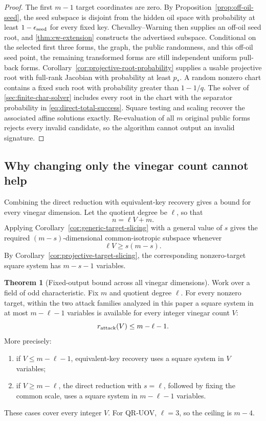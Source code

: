 \documentclass[11pt,a4paper]{article}
\theoremstyle{definition}
\newtheorem{theorem}{Theorem}[section]
\theoremstyle{remark}
\begin{document}
\begin{proof}
The first $m-1$ target coordinates are zero.  By
Proposition~\ref{prop:off-oil-seed}, the seed subspace is disjoint from the hidden oil
space with probability at least $1-\epsilon_{\rm seed}$ for every fixed key.
Chevalley--Warning then supplies an off-oil seed root, and
\cref{thm:cw-extension} constructs the advertised subspace.  Conditional on
the selected first three forms, the graph, the public randomness, and this off-oil
seed point, the remaining transformed forms are still independent uniform
pull-back forms.  Corollary~\ref{cor:projective-root-probability} supplies a
usable projective root with full-rank Jacobian with probability at least
$p_*$.  A random nonzero chart contains a fixed such root with probability
greater than $1-1/q$.  The solver of \cref{sec:finite-char-solver} includes
every root in the chart with the separator probability in
\eqref{eq:direct-total-success}.  Square testing and
scaling recover the associated affine solutions exactly.  Re-evaluation of
all $m$ original public forms rejects every invalid candidate,
so the algorithm cannot output an invalid signature.
\end{proof}

\subsection{Why changing only the vinegar count cannot help}

Combining the direct reduction with equivalent-key recovery gives
a bound for every vinegar dimension.  Let the quotient degree be $\ell$, so that
\[
 n=\ell V+m.
\]
Applying Corollary~\ref{cor:generic-target-slicing} with a general value of $s$ gives
the required $(m-s)$-dimensional common-isotropic subspace whenever
\begin{equation}\label{eq:scissors-feasibility}
 \ell V\ge s(m-s).
\end{equation}
By Corollary~\ref{cor:projective-target-slicing}, the corresponding nonzero-target
square system has $m-s-1$ variables.

\begin{theorem}[Fixed-output bound across all vinegar dimensions]\label{thm:security-scissors}
Work over a field of odd characteristic.  Fix $m$ and quotient degree $\ell$.  For every nonzero target, within the two
attack families analyzed in this paper a square system in at most
$m-\ell-1$ variables is available for every integer vinegar count $V$:
\begin{equation}\label{eq:scissors-bound}
 r_{\rm attack}(V)\le m-\ell-1.
\end{equation}
More precisely:
\begin{enumerate}
\item if $V\le m-\ell-1$, equivalent-key recovery uses a square
system in $V$ variables;
\item if $V\ge m-\ell$, the direct reduction with $s=\ell$, followed by fixing
the common scale, uses a square system in $m-\ell-1$ variables.
\end{enumerate}
These cases cover every integer $V$.  For QR-UOV, $\ell=3$, so the ceiling is
$m-4$.
\end{theorem}
\end{document}
